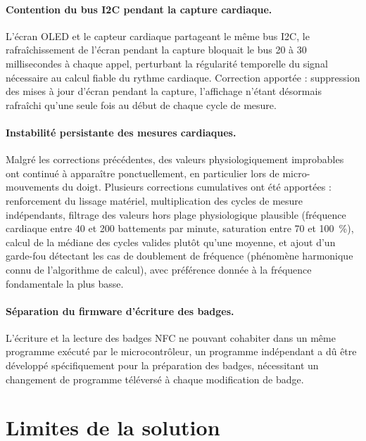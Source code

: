 \documentclass[12pt,a4paper]{report}
\begin{document}
\paragraph{Contention du bus I2C pendant la capture cardiaque.} L'écran OLED et le capteur cardiaque partageant le même bus I2C, le rafraîchissement de l'écran pendant la capture bloquait le bus 20 à 30 millisecondes à chaque appel, perturbant la régularité temporelle du signal nécessaire au calcul fiable du rythme cardiaque. Correction apportée : suppression des mises à jour d'écran pendant la capture, l'affichage n'étant désormais rafraîchi qu'une seule fois au début de chaque cycle de mesure.

\paragraph{Instabilité persistante des mesures cardiaques.} Malgré les corrections précédentes, des valeurs physiologiquement improbables ont continué à apparaître ponctuellement, en particulier lors de micro-mouvements du doigt. Plusieurs corrections cumulatives ont été apportées : renforcement du lissage matériel, multiplication des cycles de mesure indépendants, filtrage des valeurs hors plage physiologique plausible (fréquence cardiaque entre 40 et 200 battements par minute, saturation entre 70 et 100~\%), calcul de la médiane des cycles valides plutôt qu'une moyenne, et ajout d'un garde-fou détectant les cas de doublement de fréquence (phénomène harmonique connu de l'algorithme de calcul), avec préférence donnée à la fréquence fondamentale la plus basse.

\paragraph{Séparation du firmware d'écriture des badges.} L'écriture et la lecture des badges NFC ne pouvant cohabiter dans un même programme exécuté par le microcontrôleur, un programme indépendant a dû être développé spécifiquement pour la préparation des badges, nécessitant un changement de programme téléversé à chaque modification de badge.

\section{Limites de la solution}
\end{document}
